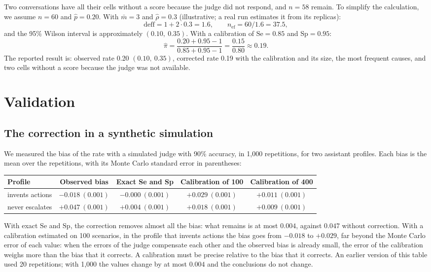 \documentclass[11pt,a4paper]{article}
\begin{document}
Two conversations have all their cells without a score because the judge did not respond, and $n = 58$ remain.
To simplify the calculation, we assume $n = 60$ and $\hat{p} = 0.20$. With $\bar{m} = 3$ and $\hat{\rho} = 0.3$
(illustrative; a real run estimates it from its replicas):
\[
  \mathrm{deff} = 1 + 2 \cdot 0.3 = 1.6, \qquad n_{\mathrm{ef}} = 60 / 1.6 = 37.5,
\]
and the 95\% Wilson interval is approximately $(0.10,\ 0.35)$. With a calibration of $\mathrm{Se} = 0.85$ and
$\mathrm{Sp} = 0.95$:
\[
  \hat{\pi} = \frac{0.20 + 0.95 - 1}{0.85 + 0.95 - 1} = \frac{0.15}{0.80} \approx 0.19.
\]
The reported result is: observed rate 0.20 $(0.10,\ 0.35)$, corrected rate 0.19 with the calibration and its
size, the most frequent causes, and two cells without a score because the judge was not available.

\section{Validation}
\label{sec:validation}

\subsection{The correction in a synthetic simulation}

We measured the bias of the rate with a simulated judge with 90\% accuracy, in 1{,}000 repetitions, for two
assistant profiles. Each bias is the mean over the repetitions, with its Monte Carlo standard error in parentheses:

\begin{center}
\begin{tabular}{@{}lcccc@{}}
\toprule
Profile & Observed bias & Exact Se and Sp & Calibration of 100 & Calibration of 400 \\
\midrule
invents actions & $-0.018\ (0.001)$ & $-0.000\ (0.001)$ & $+0.029\ (0.001)$ & $+0.011\ (0.001)$ \\
never escalates & $+0.047\ (0.001)$ & $+0.004\ (0.001)$ & $+0.018\ (0.001)$ & $+0.009\ (0.001)$ \\
\bottomrule
\end{tabular}
\end{center}

With exact $\mathrm{Se}$ and $\mathrm{Sp}$, the correction removes almost all the bias: what remains is at most
$0.004$, against $0.047$ without correction. With a calibration estimated on 100 scenarios, in the profile that
invents actions the bias goes from $-0.018$ to $+0.029$, far beyond the Monte Carlo error of each value: when
the errors of the judge compensate each other and the observed bias is already small, the error of the calibration
weighs more than the bias that it corrects. A calibration must be precise relative to the bias that it corrects.
An earlier version of this table used 20 repetitions; with 1{,}000 the values change by at most $0.004$ and the
conclusions do not change.
\end{document}
